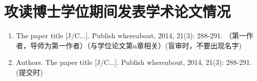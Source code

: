 
\chapter*{攻读博士学位期间发表学术论文情况}

\begin{enumerate}
	\item The paper title [J/C...]. Publish whereabout, 2014, 21(3): 288-291. （第一作者，导师为第一作者）（与学位论文第n章相关）(盲审时，不要出现名字)
	\item Authors. The paper title [J/C...]. Publish whereabout, 2014, 21(3): 288-291. (提交时)
\end{enumerate}

